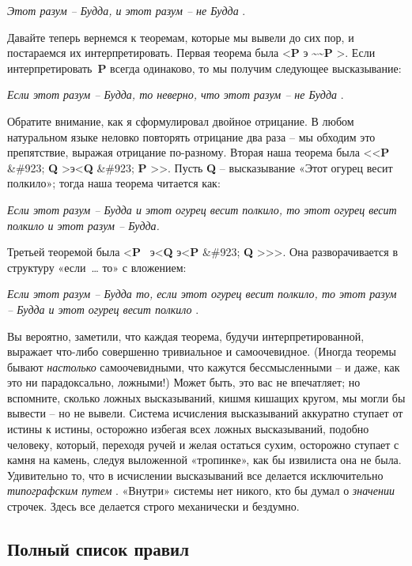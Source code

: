 \documentclass[../main.tex]{subfiles}
\begin{document}
\emph{Этот разум \--- Будда, и этот разум \--- не Будда} .

Давайте теперь вернемся к теоремам, которые мы вывели до сих пор, и постараемся их интерпретировать. Первая теорема была \textless{}\textbf{P} э \textbf{\textasciitilde\textasciitilde P} \textgreater. Если интерпретировать~\textbf{P} всегда одинаково, то мы получим следующее высказывание:

\emph{Если этот разум \--- Будда, то неверно, что этот разум \--- не Будда} .

Обратите внимание, как я сформулировал двойное отрицание. В любом натуральном языке неловко повторять отрицание два раза \--- мы обходим это препятствие, выражая отрицание по-разному. Вторая наша теорема была \textless\textless{}\textbf{P} \&\#923; \textbf{Q} \textgreater э\textless{}\textbf{Q} \&\#923; \textbf{P} \textgreater\textgreater. Пусть \textbf{Q} \--- высказывание «Этот огурец весит полкило»; тогда наша теорема читается как:

\emph{Если этот разум \--- Будда и этот огурец весит полкило, то этот огурец весит полкило и этот разум \--- Будда.}

Третьей теоремой была \textless{}\textbf{P} ~э\textless{}\textbf{Q} э\textless{}\textbf{P} \&\#923; \textbf{Q} \textgreater\textgreater\textgreater. Она разворачивается в структуру «если~\ldots{} то» с вложением:

\emph{Если этот разум \--- Будда то, если этот огурец весит полкило, то этот разум \--- Будда и этот огурец весит полкило} .

Вы вероятно, заметили, что каждая теорема, будучи интерпретированной, выражает что-либо совершенно тривиальное и самоочевидное. (Иногда теоремы бывают \emph{настолько} самоочевидными, что кажутся бессмысленными \--- и даже, как это ни парадоксально, ложными!) Может быть, это вас не впечатляет; но вспомните, сколько ложных высказываний, кишмя кишащих кругом, мы могли бы вывести \--- но не вывели. Система исчисления высказываний аккуратно ступает от истины к истины, осторожно избегая всех ложных высказываний, подобно человеку, который, переходя ручей и желая остаться сухим, осторожно ступает с камня на камень, следуя выложенной «тропинке», как бы извилиста она не была. Удивительно то, что в исчислении высказываний все делается исключительно \emph{типографским путем} . «Внутри» системы нет никого, кто бы думал о \emph{значении} строчек. Здесь все делается строго механически и бездумно.


\subsection{Полный список правил}
\end{document}
